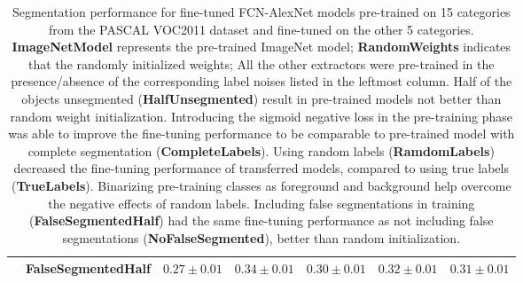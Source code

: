 \begin{table}[t]
{\begin{tabular}{l|l|llll|l}
                                                                                      & FalseSegmentedHalf                                                  & \multicolumn{1}{l}{$0.27\pm0.01$}                                                                       & \multicolumn{1}{l}{$0.34\pm0.01$}                                                           & \multicolumn{1}{l}{$0.30\pm0.01$}                                                                              & \multicolumn{1}{l|}{$0.32\pm0.01$}                                                                      & $\mathbf{0.31\pm0.01}$                                                                                                 \\ \hline

\end{tabular}
}
\caption{
Segmentation performance for fine-tuned FCN-AlexNet models pre-trained on 15 categories from the PASCAL VOC2011 dataset and fine-tuned on the other 5 categories.
\textbf{ImageNetModel} represents the pre-trained ImageNet model;
\textbf{RandomWeights} indicates that the randomly initialized weights;
All the other extractors were pre-trained in the presence/absence of the corresponding label noises listed in the leftmost column.
Half of the objects unsegmented (\textbf{HalfUnsegmented}) result in pre-trained models not better than random weight initialization.
Introducing the sigmoid negative loss in the pre-training phase was able to improve the fine-tuning performance to be comparable to pre-trained model with complete segmentation (\textbf{CompleteLabels}).
Using random labels (\textbf{RamdomLabels}) decreased the fine-tuning performance of transferred models, compared to using true labels (\textbf{TrueLabels}).
Binarizing pre-training classes as foreground and background help overcome the negative effects of random labels.
Including false segmentations in training (\textbf{FalseSegmentedHalf}) had the same fine-tuning performance as not including false segmentations (\textbf{NoFalseSegmented}), better than random initialization.
}
\label{tab:robustness}
\end{table}


